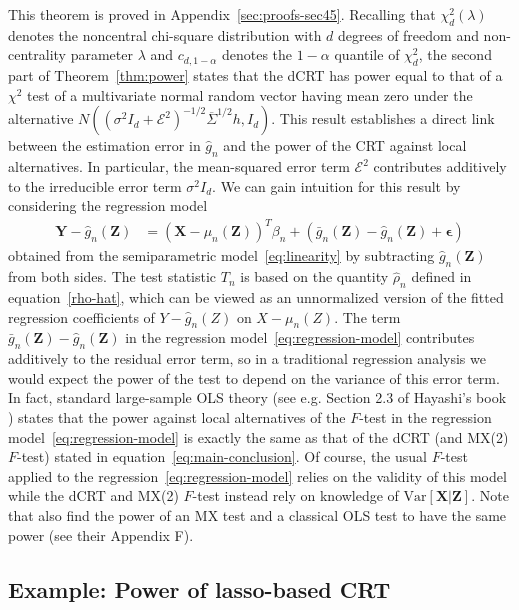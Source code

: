 \documentclass[12pt]{article}
\theoremstyle{definition}
\theoremstyle{remark}
\newcommand{\eps}{\epsilon}
\newcommand{\prx}{\bm X}
\newcommand{\srx}{X}
\newcommand{\prz}{\bm Z}
\newcommand{\srz}{Z}
\newcommand{\pry}{{\bm Y}}
\newcommand{\sry}{Y}
\begin{document}
This theorem is proved in Appendix~\ref{sec:proofs-sec45}. Recalling that $\chi^2_d(\lambda)$ denotes the noncentral chi-square distribution with $d$ degrees of freedom and non-centrality parameter $\lambda$ and $c_{d,1-\alpha}$ denotes the $1-\alpha$ quantile of $\chi^2_d$, the second part of Theorem~\ref{thm:power} states that the dCRT has power equal to that of a $\chi^2$ test of a multivariate normal random vector having mean zero under the alternative $N((\sigma^2I_d +\mathcal E^2)^{-1/2}\overline \Sigma^{1/2} h, I_d)$. This result establishes a direct link between the estimation error in $\widehat g_n$ and the power of the CRT against local alternatives. In particular, the mean-squared error term $\mathcal E^2$ contributes additively to the irreducible error term $\sigma^2 I_d$. We can gain intuition for this result by considering the regression model
\begin{equation}
\begin{split}
\pry - \widehat g_n(\prz) &= (\prx - \mu_n(\prz))^T\beta_n + (\bar g_n(\prz) - \widehat g_n(\prz) + \bm \eps)
\label{eq:regression-model}
\end{split}
\end{equation}
obtained from the semiparametric model~\eqref{eq:linearity} by subtracting $\widehat g_n(\prz)$ from both sides. The test statistic $T_n$ is based on the quantity $\widehat \rho_n$ defined in equation~\eqref{rho-hat}, which can be viewed as an unnormalized version of the fitted regression coefficients of $\sry - \widehat g_n(\srz)$ on $\srx - \mu_n(\srz)$. The term $\bar g_n(\prz) - \widehat g_n(\prz)$ in the regression model~\eqref{eq:regression-model} contributes additively to the residual error term, so in a traditional regression analysis we would expect the power of the test to depend on the variance of this error term. In fact, standard large-sample OLS theory (see e.g. Section 2.3 of Hayashi's book \cite{Hayashi2000}) states that the power against local alternatives of the $F$-test in the regression model~\eqref{eq:regression-model} is exactly the same as that of the dCRT (and MX(2) $F$-test) stated in equation~\eqref{eq:main-conclusion}. Of course, the usual $F$-test applied to the regression~\eqref{eq:regression-model} relies on the validity of this model while the dCRT and MX(2) $F$-test instead rely on knowledge of $\text{Var}[\prx|\prz]$. Note that \cite{Wang2020b} also find the power of an MX test and a classical OLS test to have the same power (see their Appendix F).

\subsection{Example: Power of lasso-based CRT} \label{sec:power-lasso-based}
\end{document}
